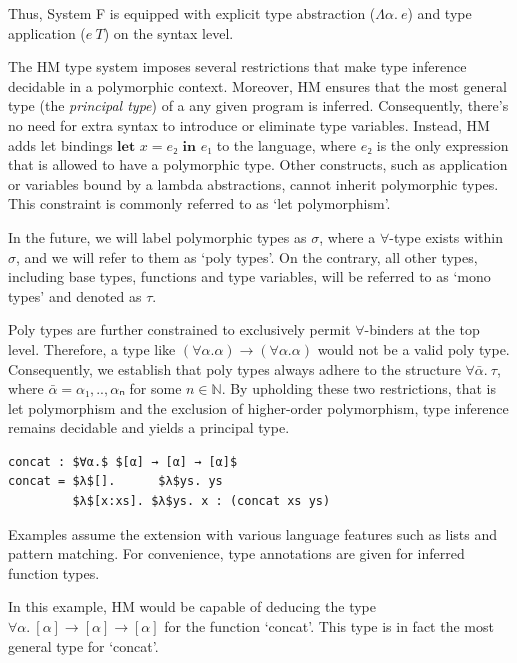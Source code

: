 \documentclass[runningheads]{llncs}
\newcommand{\kwlet}{\textbf{let }}
\newcommand{\kwin}{\textbf{ in }}
\begin{document}
Thus, System F is equipped with explicit type abstraction ($Λα. \ e$)
and type
application ($e \ T$) on the syntax level.

The HM type system imposes several restrictions that make type
inference decidable in a polymorphic context. Moreover, HM ensures that the
most general type (the \emph{principal type}) of a any given program is
inferred.
Consequently, there's no need for extra syntax to introduce or eliminate type
variables.
Instead, HM adds let bindings $\kwlet x = e₂ \kwin e₁$ to the language, where
$e₂$ is the only expression that is allowed to have a polymorphic type.
Other constructs, such as application or variables bound by a lambda
abstractions, cannot inherit polymorphic types.
This constraint is commonly referred to as `let polymorphism'.

In the future, we will label polymorphic types as $σ$,
where a $∀$-type exists within $σ$, and we will refer to them as `poly types'.
On the contrary, all other types, including base
types, functions and type variables, will be referred to as `mono types' and
denoted as $τ$.

Poly types are further constrained to exclusively permit $∀$-binders at the top
level.
Therefore, a type like $(∀α. α) → (∀α. α)$ would not be a valid poly type.
Consequently, we establish that poly types always adhere to the structure
$∀\bar{α}. \ τ$, where $\bar{α} = α₁,..,αₙ$ for some $n ∈ ℕ$.
By upholding these two restrictions, that is let polymorphism and the exclusion
of
higher-order polymorphism, type inference remains decidable and
yields a principal type.
\begin{example}
  \begin{lstlisting}
concat : $∀α.$ $[α] → [α] → [α]$
concat = $λ$[].      $λ$ys. ys           
         $λ$[x:xs]. $λ$ys. x : (concat xs ys)   
  \end{lstlisting}
\end{example}
Examples assume the extension with various language features such as
lists and pattern matching.
For convenience, type annotations are given for inferred function types.

In this example, HM would be capable of deducing the type $∀α.\ [α] → [α] →
  [α]$
for the function `concat'.
This type is in fact the most general type for `concat'.
\end{document}
